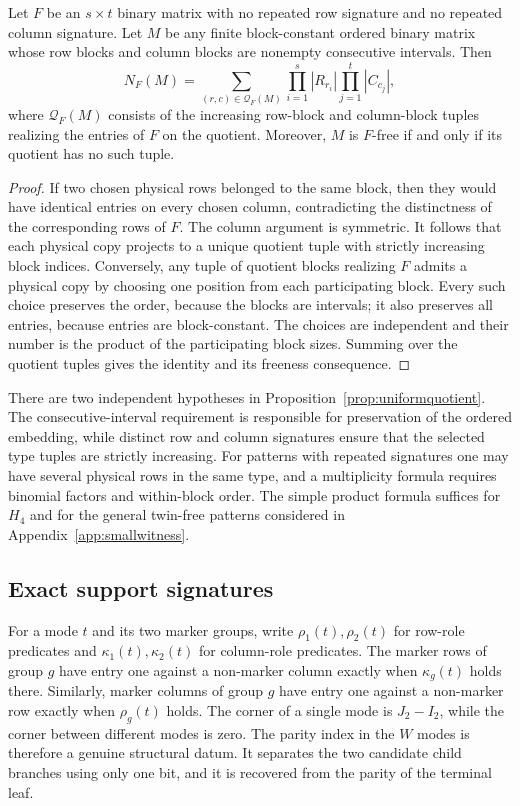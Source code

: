 \begin{proposition}\label{prop:uniformquotient}
Let $F$ be an $s\times t$ binary matrix with no repeated row
signature and no repeated column signature. Let $M$ be any finite
block-constant ordered binary matrix whose row blocks and column
blocks are nonempty consecutive intervals. Then
\[
 N_F(M)=\sum_{(r,c)\in\mathcal Q_F(M)}
      \prod_{i=1}^{s}|R_{r_i}|\prod_{j=1}^{t}|C_{c_j}|,
\]
where $\mathcal Q_F(M)$ consists of the increasing row-block and
column-block tuples realizing the entries of $F$ on the quotient.
Moreover, $M$ is $F$-free if and only if its quotient has no such
tuple.
\end{proposition}
\begin{proof}
If two chosen physical rows belonged to the same block, then they
would have identical entries on every chosen column, contradicting
the distinctness of the corresponding rows of $F$. The column
argument is symmetric. It follows that each physical copy projects
to a unique quotient tuple with strictly increasing block indices.
Conversely, any tuple of quotient blocks realizing $F$ admits a
physical copy by choosing one position from each participating
block. Every such choice preserves the order, because the blocks
are intervals; it also preserves all entries, because entries are
block-constant. The choices are independent and their number is the
product of the participating block sizes. Summing over the quotient
tuples gives the identity and its freeness consequence.
\end{proof}

There are two independent hypotheses in Proposition~\ref{prop:uniformquotient}.
The consecutive-interval requirement is responsible for preservation
of the ordered embedding, while distinct row and column signatures
ensure that the selected type tuples are strictly increasing.
For patterns with repeated signatures one may have several physical
rows in the same type, and a multiplicity formula requires binomial
factors and within-block order. The simple product formula suffices
for $H_4$ and for the general twin-free patterns considered in
Appendix~\ref{app:smallwitness}.

\subsection{Exact support signatures}
For a mode $t$ and its two marker groups, write
$\rho_1(t),\rho_2(t)$ for row-role predicates and
$\kappa_1(t),\kappa_2(t)$ for column-role predicates.
The marker rows of group $g$ have entry one against a non-marker
column exactly when $\kappa_g(t)$ holds there. Similarly, marker
columns of group $g$ have entry one against a non-marker row
exactly when $\rho_g(t)$ holds.  The corner of a single mode is
$J_2-I_2$, while the corner between different modes is zero.
The parity index in the $W$ modes is therefore a genuine structural
datum. It separates the two candidate child branches using only
one bit, and it is recovered from the parity of the terminal leaf.

